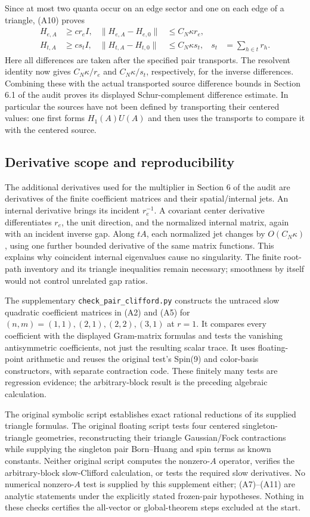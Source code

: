 Since at most two quanta occur on an edge sector and one on each edge
of a triangle, (A10) proves
\begin{align}
 H_{e,A}&\ge c r_eI,&
 \|H_{e,A}-H_{e,0}\|&\le C_N\kappa r_e,\nonumber\\
 H_{t,A}&\ge c s_tI,&
 \|H_{t,A}-H_{t,0}\|&\le C_N\kappa s_t,
 &s_t&=\sum_{h\in t}r_h.
 \tag{A11}\label{auditadd:sector-bounds}
\end{align}
Here all differences are taken after the specified pair transports.
The resolvent identity now gives $C_N\kappa/r_e$ and
$C_N\kappa/s_t$, respectively, for the inverse differences. Combining
these with the actual transported source difference bounds in Section
6.1 of the audit proves its displayed Schur-complement difference
estimate. In particular the sources have not been defined by
transporting their centered values: one first forms $H_1(A)U(A)$ and
then uses the transports to compare it with the centered source.

\subsection{Derivative scope and reproducibility}
The additional derivatives used for the multiplier in Section 6 of the
audit are derivatives of the finite coefficient matrices and their
spatial/internal jets. An internal derivative brings its incident
$r_e^{-1}$. A covariant center derivative differentiates $r_e$, the
unit direction, and the normalized internal matrix, again with an
incident inverse gap. Along $tA$, each normalized jet changes by
$O(C_N\kappa)$, using one further bounded derivative of the same matrix
functions. This explains why coincident internal eigenvalues cause no
singularity. The finite root-path inventory and its triangle
inequalities remain necessary; smoothness by itself would not control
unrelated gap ratios.

The supplementary \texttt{check\_pair\_clifford.py} constructs the
untraced slow quadratic coefficient matrices in (A2) and (A5) for
$(n,m)=(1,1),(2,1),(2,2),(3,1)$ at $r=1$. It compares every coefficient
with the displayed Gram-matrix formulas and tests the vanishing
antisymmetric coefficients, not just the resulting scalar trace.
It uses floating-point arithmetic and reuses the original test's
Spin(9) and color-basis constructors, with separate contraction code.
These finitely many tests are regression evidence; the arbitrary-block
result is the preceding algebraic calculation.

The original symbolic script establishes exact rational reductions of
its supplied triangle formulas. The original floating script tests four
centered singleton-triangle geometries, reconstructing their triangle
Gaussian/Fock contractions while supplying the singleton pair
Born--Huang and spin terms as known constants. Neither original script
computes the nonzero-$A$ operator, verifies the arbitrary-block
slow-Clifford calculation, or tests the required slow derivatives.
No numerical nonzero-$A$ test is supplied by this supplement either;
(A7)--(A11) are analytic statements under the explicitly stated
frozen-pair hypotheses. Nothing in these checks certifies the
all-vector or global-theorem steps excluded at the start.
